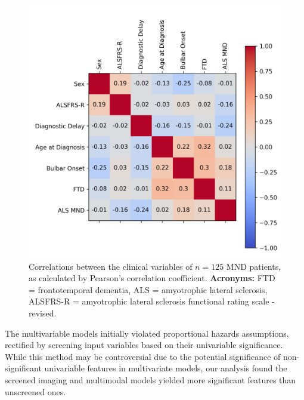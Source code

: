 \begin{figure}
    \centering
    \includegraphics[width=0.75\linewidth]{figures/clinical_correlation}
    \caption[Correlations between the clinical variables of $n=125$ MND patients, as calculated by Pearson's correlation coefficient.]{Correlations between the clinical variables of $n=125$ MND patients, as calculated by Pearson's correlation coefficient. \textbf{Acronyms:} FTD = frontotemporal dementia, ALS = amyotrophic lateral sclerosis, ALSFRS-R = amyotrophic lateral sclerosis functional rating scale - revised.}
    \label{fig:clinicalcorrelation}
\end{figure}

The multivariable models initially violated proportional hazards assumptions, rectified by screening input variables based on their univariable significance.
While this method may be controversial due to the potential significance of non-significant univariable features in multivariate models, our analysis found the screened imaging and multimodal models yielded more significant features than unscreened ones.

